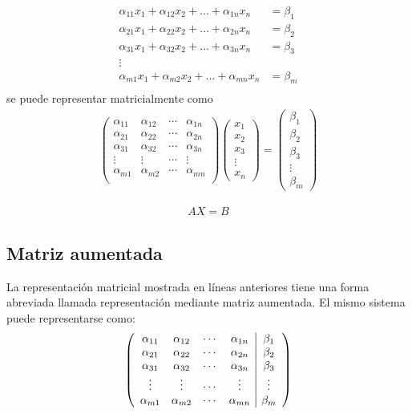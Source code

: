 \begin{align*}
\alpha_{11} x_1+\alpha_{12} x_2+\hdots+\alpha_{1n} x_n&=\beta_1\\
\alpha_{21} x_1+\alpha_{22} x_2+\hdots+\alpha_{2n} x_n&=\beta_2\\
\alpha_{31} x_1+\alpha_{32} x_2+\hdots+\alpha_{3n} x_n&=\beta_3\\
\vdots\\
\alpha_{m1} x_1+\alpha_{m2} x_2+\hdots+\alpha_{mn} x_n&=\beta_m\\
\end{align*} 
se puede representar matricialmente como
\begin{align*}
\begin{pmatrix}
    \alpha_{11} &\alpha_{12} &\cdots&\alpha_{1n} \\
    \alpha_{21} &\alpha_{22} &\cdots&\alpha_{2n} \\
    \alpha_{31} &\alpha_{32} &\cdots&\alpha_{3n} \\
    \vdots&\vdots&\cdots&\vdots\\
    \alpha_{m1} &\alpha_{m2} &\cdots&\alpha_{mn}\\
\end{pmatrix}
\begin{pmatrix}
    x_1\\x_2\\x_3\\\vdots\\x_n
\end{pmatrix}
=
\begin{pmatrix}
    \beta_1\\\beta_2\\\beta_3\\\vdots\\\beta_m
\end{pmatrix}
\end{align*}

\begin{align*}
AX=B
\end{align*}
\subsection{Matriz aumentada}
La representación matricial mostrada en líneas anteriores tiene una forma abreviada llamada representación mediante matriz aumentada. El mismo sistema puede representarse como:
\begin{align*}
\reducir{cccc|c}{
\alpha_{11} &\alpha_{12} &\cdots&\alpha_{1n}&\beta_1 \\
\alpha_{21} &\alpha_{22} &\cdots&\alpha_{2n}&\beta_2 \\
\alpha_{31} &\alpha_{32} &\cdots&\alpha_{3n}&\beta_3 \\
\vdots&\vdots&\cdots&\vdots&\vdots\\
\alpha_{m1} &\alpha_{m2} &\cdots&\alpha_{mn}&\beta_m\\
}
\end{align*}

